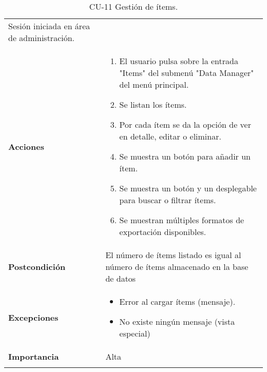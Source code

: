 \begin{longtable}[]{@{}ll@{}}
\begin{minipage}[t]{0.73\columnwidth}
Sesión iniciada en área de administración.\strut
\end{minipage}\tabularnewline
\begin{minipage}[t]{0.21\columnwidth}\raggedright
\textbf{Acciones}\strut
\end{minipage} & \begin{minipage}[t]{0.73\columnwidth}\raggedright
\begin{enumerate}
\def\labelenumi{\arabic{enumi}.}
\tightlist
\item
  El usuario pulsa sobre la entrada "Items" del submenú "Data Manager"
  del menú principal.
\item
  Se listan los ítems.
\item
  Por cada ítem se da la opción de ver en detalle, editar o eliminar.
\item
  Se muestra un botón para añadir un ítem.
\item
  Se muestra un botón y un desplegable para buscar o filtrar ítems.
\item
  Se muestran múltiples formatos de exportación disponibles.
\end{enumerate}\strut
\end{minipage}\tabularnewline
\begin{minipage}[t]{0.21\columnwidth}\raggedright
\textbf{Postcondición}\strut
\end{minipage} & \begin{minipage}[t]{0.73\columnwidth}\raggedright
El número de ítems listado es igual al número de ítems almacenado en la
base de datos\strut
\end{minipage}\tabularnewline
\begin{minipage}[t]{0.21\columnwidth}\raggedright
\textbf{Excepciones}\strut
\end{minipage} & \begin{minipage}[t]{0.73\columnwidth}\raggedright
\begin{itemize}
\tightlist
\item
  Error al cargar ítems (mensaje).
\item
  No existe ningún mensaje (vista especial)
\end{itemize}\strut
\end{minipage}\tabularnewline
\begin{minipage}[t]{0.21\columnwidth}\raggedright
\textbf{Importancia}\strut
\end{minipage} & \begin{minipage}[t]{0.73\columnwidth}\raggedright
Alta\strut
\end{minipage}\tabularnewline
\bottomrule
\caption{CU-11 Gestión de ítems.}
\end{longtable}


